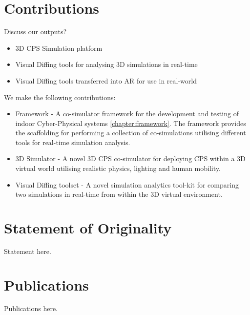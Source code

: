 \section{Contributions}
\label{sec:Contributions}
Discuss our outputs?
\begin{itemize}
  \item 3D CPS Simulation platform
  \item Visual Diffing tools for analysing 3D simulations in real-time
  \item Visual Diffing tools transferred into AR for use in real-world
\end{itemize}

We make the following contributions:
\begin{itemize}
  \item Framework - A co-simulator framework for the development and testing of indoor Cyber-Physical systems \ref{chapter:framework}. The framework provides the scaffolding for performing a collection of co-simulations utilising different tools for real-time simulation analysis.
  \item 3D Simulator - A novel 3D CPS co-simulator for deploying CPS within a 3D virtual world utilising realistic physics, lighting and human mobility.
  \item Visual Diffing toolset - A novel simulation analytics tool-kit for comparing two simulations in real-time from within the 3D virtual environment.
\end{itemize}

\section{Statement of Originality}

Statement here.


\section{Publications}

Publications here.

